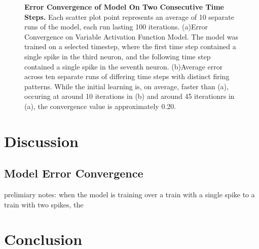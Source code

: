 \documentclass[11pt]{article}
\begin{document}
\begin{figure}[H]
\caption{\textbf{Error Convergence of Model On Two Consecutive Time Steps.} Each scatter plot point represents an average of 10 separate runs of the model, each run lasting 100 iterations. (a)Error Convergence on Variable Activation Function Model. The model was trained on a selected timestep, where the first time step contained a single spike in the third neuron, and the following time step contained a single spike in the seventh neuron. (b)Average error across ten separate runs of differing time steps with distinct firing patterns. While the initial learning is, on average, faster than (a), occuring at around 10 iterations in (b) and around 45 iterationrs in (a), the convergence value is approximately 0.20.}
\label{fig:errorTwoTime}
\end{figure}

\section{Discussion}

\subsection{Model Error Convergence}
prelimiary notes: when the model is training over a train with a single spike to a train with two spikes, the 

\section{Conclusion}
\end{document}
